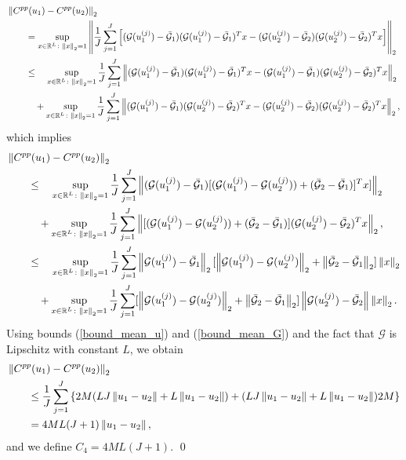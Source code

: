 \begin{align*}
& \left\|C^{pp}(u_1) - C^{pp}(u_2)\right\|_2 \\
& \qquad = \sup_{x \in \mathbb{R}^L \colon \left\|x\right\|_2 = 1} \left \lVert \frac{1}{J} \sum_{j=1}^J \left [ (\mathcal{G}(u_1^{(j)}) - \bar{\mathcal{G}}_1) (\mathcal{G}(u_1^{(j)}) - \bar{\mathcal{G}}_1)^T x - (\mathcal{G}(u_2^{(j)}) - \bar{\mathcal{G}}_2) (\mathcal{G}(u_2^{(j)}) - \bar{\mathcal{G}}_2)^T x \right ] \right \rVert_2 \\
& \qquad \le \quad \sup_{x \in \mathbb{R}^L \colon \left\|x\right\|_2 = 1} \frac{1}{J} \sum_{j=1}^J \left \lVert (\mathcal{G}(u_1^{(j)}) - \bar{\mathcal{G}}_1) (\mathcal{G}(u_1^{(j)}) - \bar{\mathcal{G}}_1)^T x - (\mathcal{G}(u_1^{(j)}) - \bar{\mathcal{G}}_1) (\mathcal{G}(u_2^{(j)}) - \bar{\mathcal{G}}_2)^T x \right \rVert_2 \\
& \qquad \quad + \sup_{x \in \mathbb{R}^L \colon \left\|x\right\|_2 = 1} \frac{1}{J} \sum_{j=1}^J \left \lVert (\mathcal{G}(u_1^{(j)}) - \bar{\mathcal{G}}_1) (\mathcal{G}(u_2^{(j)}) - \bar{\mathcal{G}}_2)^T x - (\mathcal{G}(u_2^{(j)}) - \bar{\mathcal{G}}_2) (\mathcal{G}(u_2^{(j)}) - \bar{\mathcal{G}}_2)^T x \right \rVert_2, 
\end{align*}
which implies
\begin{align*}
& \left\|C^{pp}(u_1) - C^{pp}(u_2)\right\|_2 \\
& \qquad \le \quad \sup_{x \in \mathbb{R}^L \colon \left\|x\right\|_2 = 1} \frac{1}{J} \sum_{j=1}^J \left \lVert (\mathcal{G}(u_1^{(j)}) - \bar{\mathcal{G}}_1) [ (\mathcal{G}(u_1^{(j)}) - \mathcal{G}(u_2^{(j)})) + (\bar{\mathcal{G}}_2 - \bar{\mathcal{G}}_1)]^T x ] \right \rVert_2 \\
& \qquad \quad + \sup_{x \in \mathbb{R}^L \colon \left\|x\right\|_2 = 1} \frac{1}{J} \sum_{j=1}^J \left \lVert [ (\mathcal{G}(u_1^{(j)}) - \mathcal{G}(u_2^{(j)})) + (\bar{\mathcal{G}}_2 - \bar{\mathcal{G}}_1) ] (\mathcal{G}(u_2^{(j)}) - \bar{\mathcal{G}}_2)^T x \right \rVert_2 , \\
& \qquad \le \quad \sup_{x \in \mathbb{R}^L \colon \left\|x\right\|_2 = 1} \frac{1}{J} \sum_{j=1}^J \left\|\mathcal{G}(u_1^{(j)}) - \bar{\mathcal{G}}_1\right\|_2 [ \left\|\mathcal{G}(u_1^{(j)}) - \mathcal{G}(u_2^{(j)})\right\|_2 + \left\|\bar{\mathcal{G}}_2 - \bar{\mathcal{G}}_1\right\|_2 ] \left\|x\right\|_2 \\
& \qquad \quad + \sup_{x \in \mathbb{R}^L \colon \left\|x\right\|_2 = 1} \frac{1}{J} \sum_{j=1}^J [ \left\|\mathcal{G}(u_1^{(j)}) - \mathcal{G}(u_2^{(j)})\right\|_2 + \left\|\bar{\mathcal{G}}_2 - \bar{\mathcal{G}}_1\right\|_2 ] \left\|\mathcal{G}(u_2^{(j)}) - \bar{\mathcal{G}}_2\right\| \left\|x\right\|_2.
\end{align*}
Using bounds (\ref{bound_mean_u}) and (\ref{bound_mean_G}) and the fact that $\mathcal{G}$ is Lipschitz with constant $L$, we obtain
\begin{align*}
& \left\|C^{pp}(u_1) - C^{pp}(u_2)\right\|_2 \\
& \qquad \le \frac{1}{J} \sum_{j=1}^J \left \{ 2M ( LJ \left\|u_1 - u_2\right\| + L \left\|u_1 - u_2\right\| ) + ( LJ \left\|u_1 - u_2\right\| + L \left\|u_1 - u_2\right\| ) 2M \right \} \\
& \qquad = 4 M L (J+1) \left\|u_1 - u_2\right\|,
\end{align*}
and we define $C_4 = 4 M L (J+1)$.
\qed

